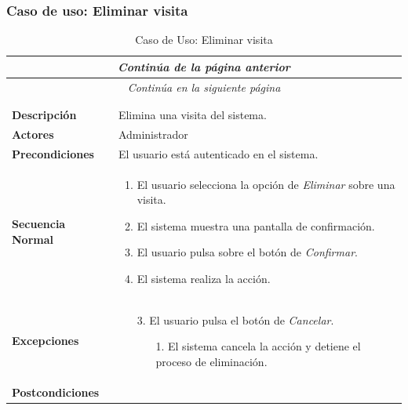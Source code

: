 \newpage
\subsubsection*{Caso de uso: Eliminar visita }
\begin{longtable}{| p{4cm} | p{10cm} |}
\endfirsthead
\multicolumn{2}{c}{\textit{Continúa de la página anterior}}\\[12pt]
\hline
\endhead
\hline
\multicolumn{2}{c}{\textit{Continúa en la siguiente página}} \\
\endfoot
\hline
\caption{Caso de Uso: Eliminar visita}\label{fig:1}\\
\endlastfoot


\hline
\multicolumn{2}{|c|}{\textbf{CU$<$33$>$ - Eliminar Visita}} \\

\hline
\textbf{Descripción} &
Elimina una visita del sistema.\\

\hline
\textbf{Actores} &
Administrador\\

\hline
\textbf{Precondiciones} &
El usuario está autenticado en el sistema.\\

\hline
\textbf{Secuencia Normal} &\mbox{}\par\vspace{-\baselineskip}
\begin{enumerate}[leftmargin=0.7cm, topsep=0.1cm]
\item El usuario selecciona la opción de \textit{Eliminar} sobre una visita.
\item El sistema muestra una pantalla de confirmación.
\item El usuario pulsa sobre el botón de \textit{Confirmar}.
\item El sistema realiza la acción.
\end{enumerate}


\\
\hline
\textbf{Excepciones} &\mbox{}\par\vspace{-\baselineskip}
\begin{enumerate}[leftmargin=0.9cm, topsep=0.1cm]
\item[3.] El usuario pulsa el botón de \textit{Cancelar}.
	\begin{itemize}
	\item[1.] El sistema cancela la acción y detiene el proceso de eliminación.
	\end{itemize}
\end{enumerate}
\\

\hline
\textbf{Postcondiciones} & \\
\hline
\end{longtable}



